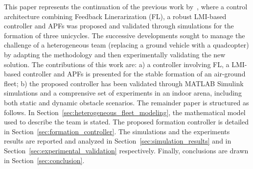 \documentclass{ifacconf}
\begin{document}
This paper represents the continuation of the previous work by~\cite{Morando2025SOSE},
where a control architecture combining Feedback Linerarization (FL), 
a robust LMI-based controller and APFs was proposed 
and validated through simulations for 
the formation of three unicycles.
The successive developments sought to manage the challenge
of a heterogeneous team (replacing a ground vehicle with a quadcopter)
by adapting the methodology and then experimentally validating 
the new solution.
The contributions of this work are: a) a controller involving FL, a LMI-based controller and APFs 
is presented for the stable formation of an air-ground fleet;
b) the proposed controller has been validated through MATLAB Simulink
simulations and a comprensive set of experiments in an indoor arena, including both static
and dynamic obstacle scenarios.
The remainder paper is structured as follows. 
In Section~\ref{sec:heterogeneous_fleet_modeling}, 
the mathematical model used to describe the team is stated.
The proposed formation controller is detailed in Section~\ref{sec:formation_controller}.
The simulations and the experiments results are reported and analyzed
in Section~\ref{sec:simulation_results} and 
in Section~\ref{sec:experimental_validation} respectively.
Finally, conclusions are drawn in Section~\ref{sec:conclusion}.
\end{document}
